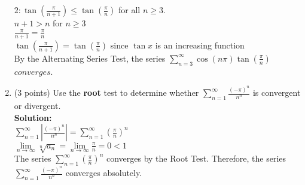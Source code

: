 \documentclass[paper=a4, fontsize=11pt]{scrartcl} %
\numberwithin{equation}{section} %
\numberwithin{figure}{section} %
\numberwithin{table}{section} %
\begin{document}
\begin{enumerate}
$2: \tan \left( \frac{\pi}{n+1}  \right) \le \tan \left( \frac{\pi}{n}  \right) $ for all $n \ge 3$. \\
$n+1 > n$ for $n \ge 3$\\
$\frac{\pi}{n+1} =\frac{\pi}{n}$ \\
$\tan \left( \frac{\pi}{n+1} \right) = \tan \left( \frac{\pi}{n} \right)$ since $\tan x$ is an increasing function\\

By the Alternating Series Test, the series $\sum\limits_{n=3}^\infty \cos (n \pi) \tan (\frac{\pi}{n})$ $\boxed{converges}$.



\newpage

\item (3 points) Use the \textbf{root} test to determine whether 
$\sum\limits_{n=1}^\infty \frac{(-\pi)^n}{n^n}$ is convergent or divergent. \\
\noindent\textbf{Solution:}\\
$\sum\limits_{n=1}^\infty |\frac{(-\pi)^n}{n^n}|=\sum\limits_{n=1}^\infty \left( \frac{\pi}{n} \right)^n$ \\
$\lim\limits_{n \rightarrow \infty} \sqrt[n]{a_n}=\lim\limits_{n \rightarrow \infty} \frac{\pi}{n}=0<1$\\
The series $\sum\limits_{n=1}^\infty \left( \frac{\pi}{n} \right)^n$ converges by the Root Test.  Therefore, the series $\sum\limits_{n=1}^\infty \frac{(-\pi)^n}{n^n}$ converges absolutely.


\end{enumerate}

\end{document}
